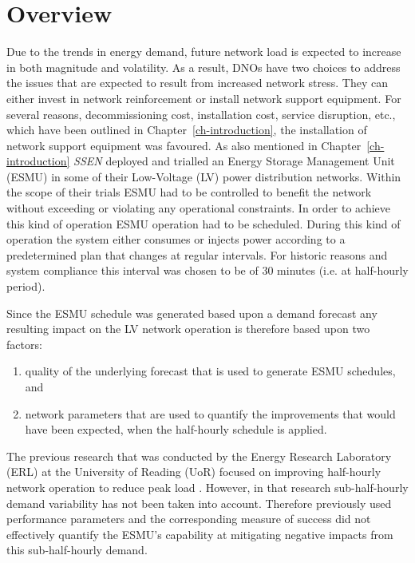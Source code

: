 \section{Overview}
\label{ch1:sec:overview}

Due to the trends in energy demand, future network load is expected to increase in both magnitude and volatility.
As a result, DNOs have two choices to address the issues that are expected to result from increased network stress.
They can either invest in network reinforcement or install network support equipment.
For several reasons,  decommissioning cost, installation cost, service disruption, etc., which have been outlined in Chapter~\ref{ch-introduction}, the installation of network support equipment was favoured.
As also mentioned in Chapter~\ref{ch-introduction} \textit{SSEN} deployed and trialled an Energy Storage Management Unit (ESMU) in some of their Low-Voltage (LV) power distribution networks.
Within the scope of their trials ESMU had to be controlled to benefit the network without exceeding or violating any operational constraints.
In order to achieve this kind of operation ESMU operation had to be scheduled.
During this kind of operation the system either consumes or injects power according to a predetermined plan that changes at regular intervals.
For historic reasons and system compliance this interval was chosen to be of 30 minutes (i.e. at half-hourly period).

Since the ESMU schedule was generated based upon a demand forecast any resulting impact on the LV network operation is therefore based upon two factors:

\begin{enumerate}
	\item quality of the underlying forecast that is used to generate ESMU schedules, and
	\item network parameters that are used to quantify the improvements that would have been expected, when the half-hourly schedule is applied.
\end{enumerate}


The previous research that was conducted by the Energy Research Laboratory (ERL) at the University of Reading (UoR) focused on improving half-hourly network operation to reduce peak load \cite{Rowe2014a, Yunusov2011}.
However, in that research sub-half-hourly demand variability has not been taken into account.
Therefore previously used performance parameters and the corresponding measure of success did not effectively quantify the ESMU's capability at mitigating negative impacts from this sub-half-hourly demand.

